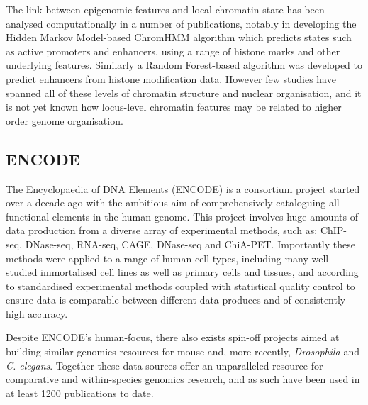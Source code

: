 \documentclass[a4paper,10pt,oneside]{book}
\begin{document}
The link between epigenomic features and local chromatin state has been
analysed computationally in a number of publications, notably in
developing the
Hidden Markov Model-based ChromHMM\cite{Ernst2012} algorithm which predicts states such as active promoters and enhancers, using a
range of histone marks and other underlying features.\cite{Ernst2011} Similarly a Random Forest-based
algorithm was developed to predict enhancers from histone
modification data.\cite{Rajagopal2013} However few studies have spanned all of
these levels of chromatin structure and nuclear organisation, and it is not yet known how locus-level chromatin features may
be related to higher order genome organisation. \\

\subsection{ENCODE}

The Encyclopaedia of DNA Elements (ENCODE) is a consortium project started over a decade ago with the ambitious aim of comprehensively cataloguing all functional elements in the human genome.\cite{Feingold2004, Qu2013, Dunham2012} This project involves huge amounts of data production from a diverse array of experimental methods, such as: ChIP-seq, DNase-seq, RNA-seq, CAGE, DNase-seq and ChiA-PET.\cite{Myers2011} Importantly these methods were applied to a range of human cell types, including many well-studied immortalised cell lines as well as primary cells and tissues, and according to standardised experimental methods\cite{Landt2012} coupled with statistical quality control\cite{Dunham2012, Boyle2014, Marinov2013} to ensure data is comparable between different data produces and of consistently-high accuracy. 

Despite ENCODE's human-focus, there also exists spin-off projects aimed at building similar genomics resources for mouse\cite{Yue2014} and, more recently, \emph{Drosophila} and \emph{C. elegans}.\cite{Ho2014} Together these data sources offer an unparalleled resource for comparative and within-species genomics research, and as such have been used in at least 1200 publications to date.\cite{encodenews}
\end{document}
